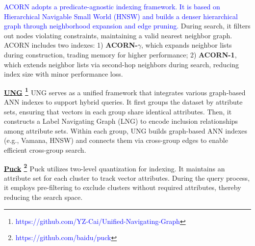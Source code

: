 \documentclass[sigconf, nonacm]{acmart}
\begin{document}
{%
	\textcolor{blue}{ACORN adopts a predicate-agnostic indexing framework. It is based on Hierarchical Navigable Small World (HNSW) \cite{hnsw} and builds a denser hierarchical graph through neighborhood expansion and edge pruning.}
	During search, it filters out nodes violating constraints, maintaining a valid nearest neighbor graph.
	ACORN includes two indexes: 1) \textbf{ACORN-$\gamma$}, which expands neighbor lists during construction, trading memory for higher performance; 
	2) \textbf{ACORN-1}, which extends neighbor lists via second-hop neighbors during search, reducing index size with minor performance loss.
	
	\noindent\textbf{\underline{UNG} \footnote{\textcolor{blue}{https://github.com/YZ-Cai/Unified-Navigating-Graph}} \cite{UNG}} 
	UNG serves as a unified framework that integrates various graph-based ANN indexes to support hybrid queries. It first groups the dataset by attribute sets, ensuring that vectors in each group share identical attributes. Then, it constructs a Label Navigating Graph (LNG) to encode inclusion relationships among attribute sets. Within each group, UNG builds graph-based ANN indexes (e.g., Vamana, HNSW) and connects them via cross-group edges to enable efficient cross-group search.
	
	
	
	\noindent\textbf{\underline{Puck} \footnote{\textcolor{blue}{https://github.com/baidu/puck}} \cite{puck}} 
	Puck utilizes two-level quantization for indexing. It maintains an attribute set for each cluster to track vector attributes. During the query process, it employs pre-filtering to exclude clusters without required attributes, thereby reducing the search space.
	
}
\end{document}
